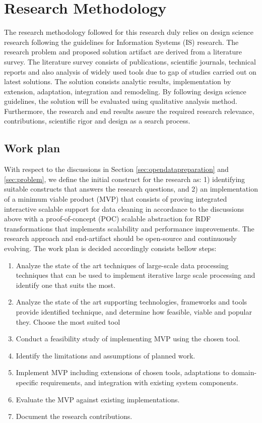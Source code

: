 \section{Research Methodology}
The research methodology followed for this research duly relies on design science \cite{von2004design} research following the guidelines for Information Systems (IS) research. The research problem and proposed solution artifact are derived from a literature survey. The literature survey consists of publications, scientific journals, technical reports and also analysis of widely used tools due to gap of studies carried out on latest solutions. The solution consists analytic results, implementation by extension, adaptation, integration and remodeling.  By following design science guidelines, the solution will be evaluated using qualitative analysis method. Furthermore, the research and end results assure the  required research relevance, contributions, scientific rigor and design as a search process. 
\subsection{Work plan}
\noindent With respect to the discussions in Section \ref{sec:opendatapreparation}  and \ref{sec:problem}, we define the initial construct for the research as: 1) identifying suitable constructs that answers the research questions, and  2) an implementation of a minimum viable product (MVP) that consists of proving integrated interactive scalable support for data cleaning in accordance to the discussions above with a proof-of-concept (POC) scalable abstraction for RDF transformations that implements scalability and performance improvements. The research approach and end-artifact should be open-source and continuously evolving.  The work plan is decided accordingly consists bellow steps:
\begin{enumerate}
\item Analyze the state of the art techniques of large-scale data processing techniques that can be used to implement iterative large scale processing and identify one that suits the most.
\item Analyze the state of the art supporting technologies, frameworks and tools provide identified technique, and determine how feasible, viable and popular they. Choose the most suited tool
\item Conduct a feasibility study of implementing MVP using the chosen tool.
\item Identify the limitations and assumptions of planned work. 
\item Implement MVP including extensions of chosen tools, adaptations to domain-specific requirements, and integration with existing system components.
\item Evaluate the MVP against existing implementations.
\item Document the research contributions. 
\end{enumerate}

